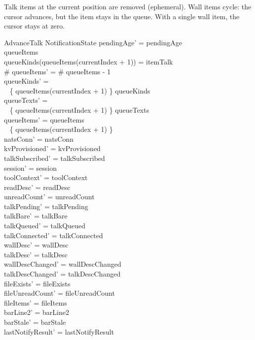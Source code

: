 \documentclass[a4paper,10pt,fleqn]{article}
\begin{document}
Talk items at the current position are removed (ephemeral).
Wall items cycle: the cursor advances, but the item stays in the
queue.  With a single wall item, the cursor stays at zero.

\begin{schema}{AdvanceTalk}
  \Delta NotificationState
  \where
  pendingAge' = pendingAge \\
  queueItems \neq \langle \rangle \\
  queueKinds(queueItems(currentIndex + 1)) = itemTalk \\
  \# queueItems' = \# queueItems - 1 \\
  queueKinds' = \\
  \quad~ \{ queueItems(currentIndex + 1) \} \ndres queueKinds \\
  queueTexts' = \\
  \quad~ \{ queueItems(currentIndex + 1) \} \ndres queueTexts \\
  \ran queueItems' = \ran queueItems \setminus \\
  \quad~ \{ queueItems(currentIndex + 1) \} \\
  natsConn' = natsConn \\
  kvProvisioned' = kvProvisioned \\
  talkSubscribed' = talkSubscribed \\
  session' = session \\
  toolContext' = toolContext \\
  readDesc' = readDesc \\
  unreadCount' = unreadCount \\
  talkPending' = talkPending \\
  talkBare' = talkBare \\
  talkQueued' = talkQueued \\
  talkConnected' = talkConnected \\
  wallDesc' = wallDesc \\
  talkDesc' = talkDesc \\
  wallDescChanged' = wallDescChanged \\
  talkDescChanged' = talkDescChanged \\
  fileExists' = fileExists \\
  fileUnreadCount' = fileUnreadCount \\
  fileItems' = fileItems \\
  barLine2' = barLine2 \\
  barStale' = barStale \\
  lastNotifyResult' = lastNotifyResult \\

\end{schema}
\end{document}
